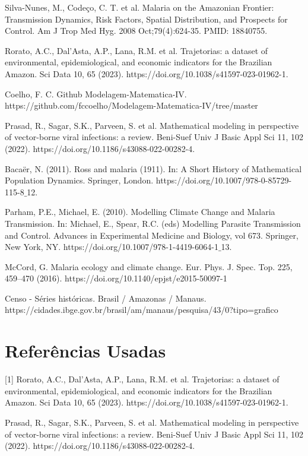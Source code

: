 \documentclass[12pt]{article}
\begin{document}
\noindent [3] Silva-Nunes, M., Codeço, C. T. et al. Malaria on the Amazonian Frontier: Transmission Dynamics, Risk Factors, Spatial Distribution, and Prospects for Control. Am J Trop Med Hyg. 2008 Oct;79(4):624-35. PMID: 18840755.

\noindent [4] Rorato, A.C., Dal’Asta, A.P., Lana, R.M. et al. Trajetorias: a dataset of environmental, epidemiological, and economic indicators for the Brazilian Amazon. Sci Data 10, 65 (2023). https://doi.org/10.1038/s41597-023-01962-1.

\noindent [5] Coelho, F. C. Github Modelagem-Matematica-IV. https://github.com/fccoelho/Modelagem-Matematica-IV/tree/master

\noindent [6] Prasad, R., Sagar, S.K., Parveen, S. et al. Mathematical modeling in perspective of vector-borne viral infections: a review. Beni-Suef Univ J Basic Appl Sci 11, 102 (2022). https://doi.org/10.1186/s43088-022-00282-4.

\noindent [7] Bacaër, N. (2011). Ross and malaria (1911). In: A Short History of Mathematical Population Dynamics. Springer, London. https://doi.org/10.1007/978-0-85729-115-8$\_$12.

\noindent [8] Parham, P.E., Michael, E. (2010). Modelling Climate Change and Malaria Transmission. In: Michael, E., Spear, R.C. (eds) Modelling Parasite Transmission and Control. Advances in Experimental Medicine and Biology, vol 673. Springer, New York, NY. https://doi.org/10.1007/978-1-4419-6064-1$\_$13.

\noindent [9] McCord, G. Malaria ecology and climate change. Eur. Phys. J. Spec. Top. 225, 459–470 (2016). https://doi.org/10.1140/epjst/e2015-50097-1

\noindent [10] Censo - Séries históricas. Brasil / Amazonas / Manaus. 
\\https://cidades.ibge.gov.br/brasil/am/manaus/pesquisa/43/0?tipo=grafico

\newpage
\section{Referências Usadas}

[1] Rorato, A.C., Dal’Asta, A.P., Lana, R.M. et al. Trajetorias: a dataset of environmental, epidemiological, and economic indicators for the Brazilian Amazon. Sci Data 10, 65 (2023). https://doi.org/10.1038/s41597-023-01962-1.

\noindent [2] Prasad, R., Sagar, S.K., Parveen, S. et al. Mathematical modeling in perspective of vector-borne viral infections: a review. Beni-Suef Univ J Basic Appl Sci 11, 102 (2022). https://doi.org/10.1186/s43088-022-00282-4.
\end{document}
